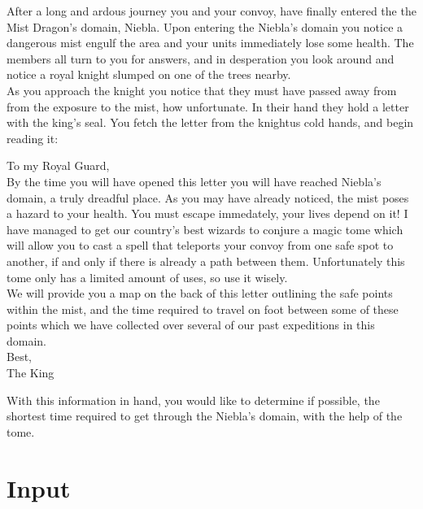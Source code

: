 


\noindent After a long and ardous journey you and your convoy, have finally entered the the Mist Dragon's domain,
Niebla. Upon entering the Niebla's domain you notice a dangerous mist engulf the area and your units immediately lose
some health. The members all turn to you for answers, and in desperation you look around and notice a royal knight
slumped on one of the trees nearby. \\

\noindent As you approach the knight you notice that they must have passed away from from the exposure to the mist, how
unfortunate. In their hand they hold a letter with the king's seal. You fetch the letter from the knightus cold hands,
and begin reading it: \\

\begin{minipage}[t]{6in}
To my Royal Guard, \\

By the time you will have opened this letter you will have reached Niebla's domain, a truly dreadful place. As you may
have already noticed, the mist poses a hazard to your health.  You must escape immedately, your lives depend on it!
I have managed to get our country's best wizards to conjure a magic tome which will allow you to cast a spell that
teleports your convoy from one safe spot to another, if and only if there is already a path between them. Unfortunately
this tome only has a limited amount of uses, so use it wisely. \\

We will provide you a map on the back of this letter outlining the safe points within the mist, and the time required
to travel on foot between some of these points which we have collected over several of our past expeditions
in this domain.\\

Best,\\
The King \\
\end{minipage}

\noindent With this information in hand, you would like to determine if possible, the shortest time required to get
through the Niebla's domain, with the help of the tome. \\

\section*{Input}

